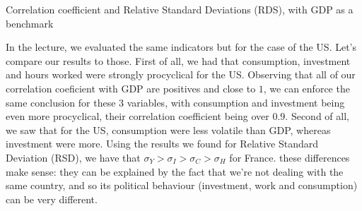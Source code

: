 \documentclass[12pt]{article}
\begin{document}
\begin{table}
    \centering
    \caption{Correlation coefficient and Relative Standard Deviations (RDS), with GDP as a benchmark}
    \label{tab:corr_RSD}
\end{table}

In the lecture, we evaluated the same indicators but for the case of the US. Let's compare our results to those. 
\newline
First of all, we had that consumption, investment and hours worked were strongly procyclical for the US. 
Observing that all of our correlation coeficient with GDP are positives and close to $1$, we can enforce the same conclusion for these $3$ variables, with consumption and investment being even more procyclical, their correlation coefficient being over $0.9$. 
\newline    
Second of all, we saw that for the US, consumption were less volatile than GDP, whereas investment were more.
Using the results we found for Relative Standard Deviation (RSD), we have that $\sigma_Y > \sigma_I > \sigma_C > \sigma_H$ for France. these differences make sense: they can be explained by the fact that we're not dealing with the same country, and so its political behaviour (investment, work and consumption) can be very different.
\end{document}
